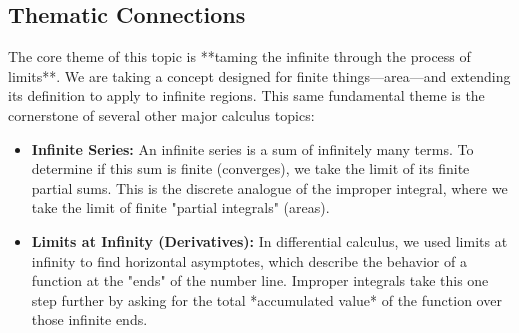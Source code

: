 \documentclass{article}
\begin{document}
\subsection{Thematic Connections}
The core theme of this topic is **taming the infinite through the process of limits**. We are taking a concept designed for finite things—area—and extending its definition to apply to infinite regions. This same fundamental theme is the cornerstone of several other major calculus topics:
\begin{itemize}
    \item \textbf{Infinite Series:} An infinite series is a sum of infinitely many terms. To determine if this sum is finite (converges), we take the limit of its finite partial sums. This is the discrete analogue of the improper integral, where we take the limit of finite "partial integrals" (areas).
    \item \textbf{Limits at Infinity (Derivatives):} In differential calculus, we used limits at infinity to find horizontal asymptotes, which describe the behavior of a function at the "ends" of the number line. Improper integrals take this one step further by asking for the total *accumulated value* of the function over those infinite ends.
\end{itemize}
\end{document}
